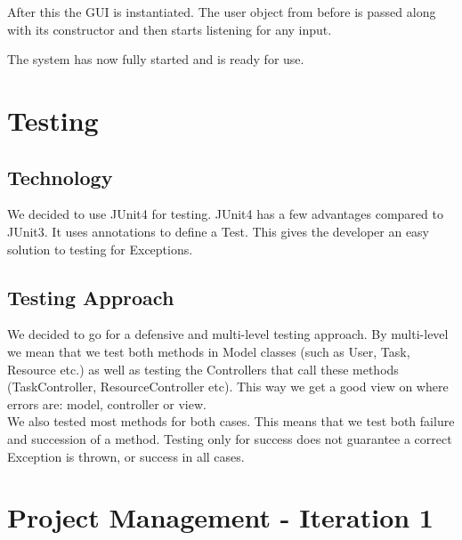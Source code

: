 	After this the GUI is instantiated. The user object from before is passed along with its constructor and then starts listening for any input. 
	
	The system has now fully started and is ready for use.	
	
	
	\section{Testing}
		\subsection{Technology}
		We decided to use JUnit4 for testing.
		JUnit4 has a few advantages compared to JUnit3. It uses annotations to define a Test. This gives the developer an easy solution to testing for Exceptions.
		\subsection{Testing Approach}
		We decided to go for a defensive and multi-level testing approach.
		By multi-level we mean that we test both methods in Model classes (such as User, Task, Resource etc.) as well as testing the Controllers that call these methods (TaskController, ResourceController etc). 
		This way we get a good view on where errors are: model, controller or view.\\
		We also tested most methods for both cases. This means that we test both failure and succession of a method. Testing only for success does not guarantee a correct Exception is thrown, or success in all cases.
	\section{Project Management - Iteration 1}
